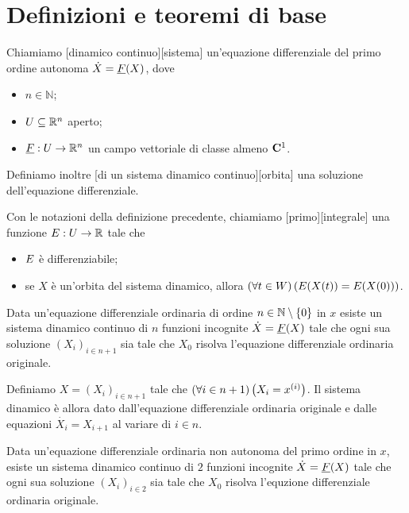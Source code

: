 \section{Definizioni e teoremi di base}
\label{SistemiDinamici_DefinizioniETeoremiDiBase}
\begin{Definition}
	Chiamiamo [dinamico continuo][sistema] un'equazione differenziale del primo ordine autonoma $\dot{X} = \underline{F}(X)$, dove
	\begin{itemize}
		\item $n \in \mathbb{N}$;
		\item $U \subseteq \mathbb{R}^n$ aperto;
		\item $\underline{F}: U \rightarrow \mathbb{R}^n$ un campo vettoriale di classe almeno $\CClass{1}$.
	\end{itemize}
	Definiamo inoltre [di un sistema dinamico continuo][orbita] una soluzione dell'equazione differenziale.
\end{Definition}
\begin{Definition}
	Con le notazioni della definizione precedente, chiamiamo [primo][integrale] una funzione $E: U \rightarrow \mathbb{R}$ tale che
	\begin{itemize}
		\item $E$ \`e differenziabile;
		\item se $X$ \`e un'orbita del sistema dinamico, allora $\left ( \forall t \in W \right ) \left ( E(X(t)) = E(X(0)) \right )$.
	\end{itemize}
\end{Definition}
\begin{Theorem}
	Data un'equazione differenziale ordinaria di ordine $n \in \mathbb{N} \setminus \lbrace 0 \rbrace$ in $x$ esiste un sistema dinamico continuo di $n$ funzioni incognite $\dot{X} = \underline{F}(X)$ tale che ogni sua soluzione $(X_i)_{i \in n + 1}$ sia tale che $X_0$ risolva l'equazione differenziale ordinaria originale.
\end{Theorem}
\Proof Definiamo $X = (X_i)_{i \in n + 1}$ tale che $\left ( \forall i \in n + 1 \right ) \left ( X_i = x^{(i)} \right )$. Il sistema dinamico \`e allora dato dall'equazione differenziale ordinaria originale e dalle equazioni $\dot{X_i} = X_{i + 1}$ al variare di $i \in n$. \EndProof
\begin{Theorem}
	Data un'equazione differenziale ordinaria non autonoma del primo ordine in $x$, esiste un sistema dinamico continuo di $2$ funzioni incognite $\dot{X} = \underline{F}(X)$ tale che ogni sua soluzione $(X_i)_{i \in 2}$ sia tale che $X_0$ risolva l'equzione differenziale ordinaria originale.
\end{Theorem}
